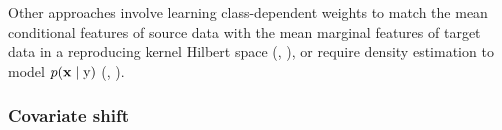Other approaches involve learning class-dependent weights to match the mean conditional features of source data with the mean marginal features of target data in a reproducing kernel Hilbert space (\citet{Zhang2013}, \citet{Iyer2004}), or require density estimation to model $p({\mathbf{x}} \mid {\textnormal{y}})$ (\citet{Chan2005}, \citet{Storkey2009}).

\subsubsection{Covariate shift}
\label{sec:cov_shift_sota}